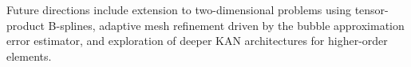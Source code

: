 \documentclass[11pt]{article}
\theoremstyle{remark}
\begin{document}
Future directions include extension to two-dimensional problems using tensor-product B-splines, adaptive mesh refinement driven by the bubble approximation error estimator, and exploration of deeper KAN architectures for higher-order elements.



\end{document}

